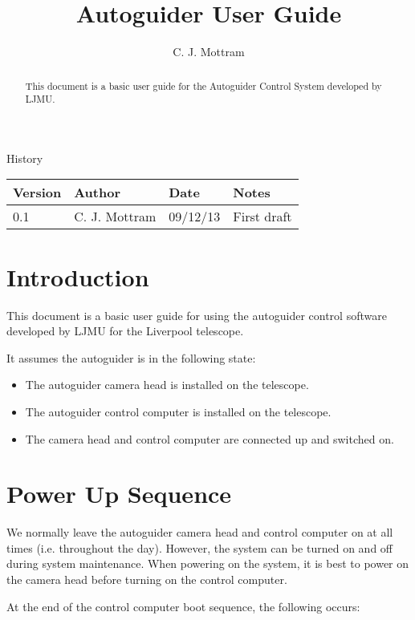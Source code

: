 \documentclass[10pt,a4paper]{article}
\title{Autoguider User Guide}
\author{C. J. Mottram}
\date{}
\begin{document}
\thispagestyle{empty}
\maketitle
\begin{abstract}
This document is a basic user guide for the Autoguider Control System developed by LJMU.
\end{abstract}
\centerline{\Large History}
\begin{center}
\begin{tabular}{|l|l|l|p{15em}|}
\hline
{\bf Version} & {\bf Author} & {\bf Date} & {\bf Notes} \\
\hline
0.1 & C. J. Mottram & 09/12/13 & First draft \\
\hline
\end{tabular}
\end{center}

\newpage
\tableofcontents
\listoffigures
\listoftables
\newpage

\section{Introduction}
This document is a basic user guide for using the autoguider control software developed by LJMU for the 
Liverpool telescope.

It assumes the autoguider is in the following state:

\begin{itemize}
\item The autoguider camera head is installed on the telescope.
\item The autoguider control computer is installed on the telescope.
\item The camera head and control computer are connected up and switched on.
\end{itemize}

\section{Power Up Sequence}

We normally leave the autoguider camera head and control computer on at all times (i.e. throughout the day).
However, the system can be turned on and off during system maintenance. When powering on the system, it is best to
power on the camera head before turning on the control computer.

At the end of the control computer boot sequence, the following occurs:
\end{document}
